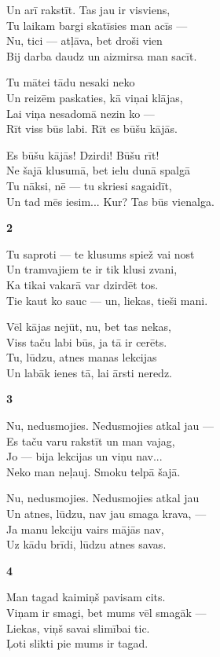 \documentclass[14pt]{extarticle}
\begin{document}
{{Un arī rakstīt. Tas jau ir visviens,\\
Tu laikam bargi skatīsies man acīs ---\\
Nu, tici --- atļāva, bet droši vien\\
Bij darba daudz un aizmirsa man sacīt. 

Tu mātei tādu nesaki neko\\
Un reizēm paskaties, kā viņai klājas,\\
Lai viņa nesadomā nezin ko ---\\
Rīt viss būs labi. Rīt es būšu kājās.

Es būšu kājās! Dzirdi! Būšu rīt!\\
Ne šajā klusumā, bet ielu dunā spalgā\\
Tu nāksi, nē --- tu skriesi sagaidīt,\\
Un tad mēs iesim... Kur? Tas būs vienalga. 


\newpage

{\bf 2}

Tu saproti --- te klusums spiež vai nost\\
Un tramvajiem te ir tik klusi zvani,\\
Ka tikai vakarā var dzirdēt tos.\\
Tie kaut ko sauc --- un, liekas, tieši mani. 

Vēl kājas nejūt, nu, bet tas nekas,\\
Viss taču labi būs, ja tā ir cerēts.\\
Tu, lūdzu, atnes manas lekcijas\\
Un labāk ienes tā, lai ārsti neredz. 



\newpage 

{\bf 3}

Nu, nedusmojies. Nedusmojies atkal jau ---\\
Es taču varu rakstīt un man vajag,\\
Jo --- bija lekcijas un viņu nav...\\
Neko man neļauj. Smoku telpā šajā. 

Nu, nedusmojies. Nedusmojies atkal jau\\
Un atnes, lūdzu, nav jau smaga krava, ---\\
Ja manu lekciju vairs mājās nav,\\
Uz kādu brīdi, lūdzu atnes savas.

\newpage

{\bf 4}

Man tagad kaimiņš pavisam cits.\\
Viņam ir smagi, bet mums vēl smagāk ---\\
Liekas, viņš savai slimībai tic.\\
Ļoti slikti pie mums ir tagad. 

}}
\end{document}
